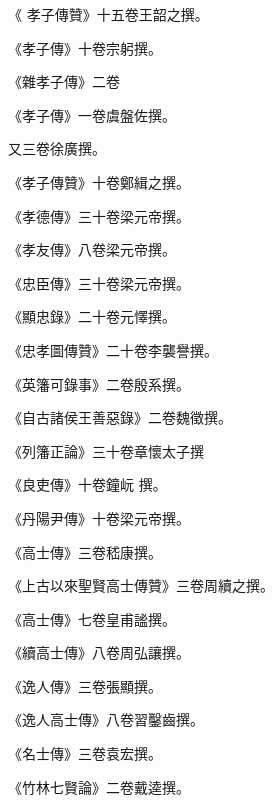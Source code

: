 \begin{pinyinscope}
 《
 孝子傳贊》十五卷王韶之撰。



 《孝子傳》十卷宗躬撰。



 《雜孝子傳》二卷



 《孝子傳》一卷虞盤佐撰。



 又三卷徐廣撰。



 《孝子傳贊》十卷鄭緝之撰。



 《孝德傳》三十卷梁元帝撰。



 《孝友傳》八卷梁元帝撰。



 《忠臣傳》三十卷梁元帝撰。



 《顯忠錄》二十卷元懌撰。



 《忠孝圖傳贊》二十卷李襲譽撰。



 《英籓可錄事》二卷殷系撰。



 《自古諸侯王善惡錄》二卷魏徵撰。



 《列籓正論》三十卷章懷太子撰



 《良吏傳》十卷鐘岏
 撰。



 《丹陽尹傳》十卷梁元帝撰。



 《高士傳》三卷嵇康撰。



 《上古以來聖賢高士傳贊》三卷周續之撰。



 《高士傳》七卷皇甫謐撰。



 《續高士傳》八卷周弘讓撰。



 《逸人傳》三卷張顯撰。



 《逸人高士傳》八卷習鑿齒撰。



 《名士傳》三卷袁宏撰。



 《竹林七賢論》二卷戴逵撰。




\end{pinyinscope}
